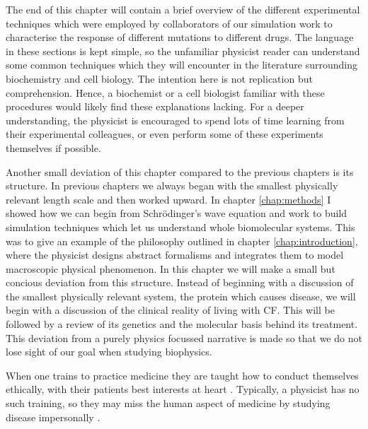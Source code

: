 The end of this chapter will contain a brief overview of the different experimental techniques which were employed by collaborators of our simulation work to characterise the response of different mutations to different drugs. The language in these sections is kept simple, so the unfamiliar physicist reader can understand some common techniques which they will encounter in the literature surrounding biochemistry and cell biology. The intention here is not replication but comprehension. Hence, a biochemist or a cell biologist familiar with these procedures would likely find these explanations lacking. For a deeper understanding, the physicist is encouraged to spend lots of time learning from their experimental colleagues, or even perform some of these experiments themselves if possible. 

Another small deviation of this chapter compared to the previous chapters is its structure. In previous chapters we always began with the smallest physically relevant length scale and then worked upward. In chapter \ref{chap:methods} I showed how we can begin from Schr\"odinger's wave equation and work to build simulation techniques which let us understand whole biomolecular systems. This was to give an example of the philosophy outlined in chapter \ref{chap:introduction}, where the physicist designs abstract formalisms and integrates them to model macroscopic physical phenomenon. In this chapter we will make a small but concious deviation from this structure. Instead of beginning with a discussion of the smallest physically relevant system, the protein which causes disease, we will begin with a discussion of the clinical reality of living with CF. This will be followed by a review of its genetics and the molecular basis behind its treatment. This deviation from a purely physics focussed narrative is made so that we do not lose sight of our goal when studying biophysics.

When one trains to practice medicine they are taught how to conduct themselves ethically, with their patients best interests at heart \cite{hajar2017}. Typically, a physicist has no such training, so they may miss the human aspect of medicine by studying disease impersonally \cite{foucault1994}. 

